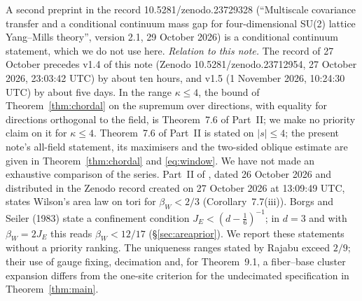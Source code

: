 \documentclass[11pt,a4paper]{article}
\theoremstyle{remark}
\theoremstyle{definition}
\theoremstyle{plain}
\theoremstyle{remark}
\begin{document}
A second preprint in the record 10.5281/zenodo.23729328 (``Multiscale covariance transfer and a conditional continuum mass gap for four-dimensional SU(2) lattice Yang--Mills theory'', version 2.1, 29 October 2026) is a conditional continuum statement, which we do not use here.
\emph{Relation to this note.} The record of 27 October precedes v1.4 of this note (Zenodo 10.5281/zenodo.23712954, 27 October 2026, 23:03:42 UTC) by about ten hours, and v1.5 (1 November 2026, 10:24:30 UTC) by about five days.
In the range $\kappa\le4$, the bound of Theorem~\ref{thm:chordal} on the supremum over directions, with equality for directions orthogonal to the field, is Theorem~7.6 of Part~II; we make no priority claim on it for $\kappa\le4$. Theorem~7.6 of Part~II is stated on $|s|\le4$; the present note's all-field statement, its maximisers and the two-sided oblique estimate are given in Theorem~\ref{thm:chordal} and \eqref{eq:window}. We have not made an exhaustive comparison of the series.
Part~II of \cite{Raj26a}, dated 26 October 2026 and distributed in the Zenodo record created on 27 October 2026 at 13:09:49 UTC, states Wilson's area law on tori for $\beta_W<2/3$ (Corollary~7.7(iii)). Borgs and Seiler \cite{BS83} (1983) state a confinement condition $J_E<(d-\frac16)^{-1}$; in $d=3$ and with $\beta_W=2J_E$ this reads $\beta_W<12/17$ (\S\ref{sec:areaprior}). We report these statements without a priority ranking.
The uniqueness ranges stated by Rajabu exceed $2/9$; their use of gauge fixing, decimation and, for Theorem~9.1, a fiber--base cluster expansion differs from the one-site criterion for the undecimated specification in Theorem~\ref{thm:main}.
\end{document}
